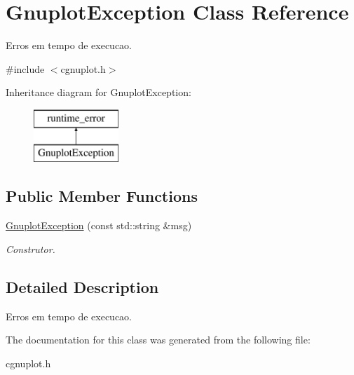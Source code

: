 \hypertarget{classGnuplotException}{\section{Gnuplot\-Exception Class Reference}
\label{classGnuplotException}
}


Erros em tempo de execucao.  




{\ttfamily \#include $<$cgnuplot.\-h$>$}

Inheritance diagram for Gnuplot\-Exception\-:\begin{figure}[H]
\begin{center}
\leavevmode
\includegraphics[height=2.000000cm]{classGnuplotException}
\end{center}
\end{figure}
\subsection*{Public Member Functions}
\begin{DoxyCompactItemize}
\item 
\hypertarget{classGnuplotException_a8b324a9ef4d3f75079d41ecd61c62d44}{\hyperlink{classGnuplotException_a8b324a9ef4d3f75079d41ecd61c62d44}{Gnuplot\-Exception} (const std\-::string \&msg)}\label{classGnuplotException_a8b324a9ef4d3f75079d41ecd61c62d44}

\begin{DoxyCompactList}\small\item\em Construtor. \end{DoxyCompactList}\end{DoxyCompactItemize}


\subsection{Detailed Description}
Erros em tempo de execucao. 

The documentation for this class was generated from the following file\-:\begin{DoxyCompactItemize}
\item 
cgnuplot.\-h\end{DoxyCompactItemize}
